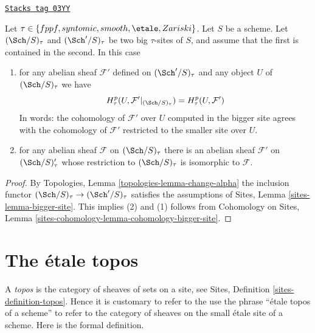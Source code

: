 \begin{lemma}
\label{etale-cohomology-lemma-cohomology-enlarge-partial-universe}
\href{https://stacks.math.columbia.edu/tag/03YY}{\texttt{Stacks tag 03YY}}

Let $\tau \in \{fppf, syntomic, smooth, \etale, Zariski\}$.
Let $S$ be a scheme.
Let $(\Sch/S)_\tau$ and $(\Sch'/S)_\tau$ be two
big $\tau$-sites of $S$, and assume that the first is contained in the second.
In this case
\begin{enumerate}
\item for any abelian sheaf $\mathcal{F}'$ defined on $(\Sch'/S)_\tau$ and
any object $U$ of $(\Sch/S)_\tau$ we have
$$
H^p_\tau(U, \mathcal{F}'|_{(\Sch/S)_\tau}) =
H^p_\tau(U, \mathcal{F}')
$$
In words: the cohomology of $\mathcal{F}'$ over $U$ computed in the bigger site
agrees with the cohomology of $\mathcal{F}'$ restricted to the smaller site
over $U$.
\item for any abelian sheaf $\mathcal{F}$ on $(\Sch/S)_\tau$ there is an
abelian sheaf $\mathcal{F}'$ on $(\Sch/S)_\tau'$ whose restriction to
$(\Sch/S)_\tau$ is isomorphic to $\mathcal{F}$.
\end{enumerate}
\end{lemma}

\begin{proof}
By Topologies, Lemma \ref{topologies-lemma-change-alpha} the inclusion functor
$(\Sch/S)_\tau \to (\Sch'/S)_\tau$ satisfies the assumptions of
Sites, Lemma \ref{sites-lemma-bigger-site}. This implies (2) and (1)
follows from
Cohomology on Sites, Lemma \ref{sites-cohomology-lemma-cohomology-bigger-site}.
\end{proof}

\section{The \'etale topos}
\label{etale-cohomology-section-etale-topos}
A {\it topos} is the category of sheaves of sets on a site, see
Sites, Definition \ref{sites-definition-topos}. Hence it is customary
to refer to the use the phrase ``\'etale topos of a scheme'' to refer to
the category of sheaves on the small \'etale site of a scheme.
Here is the formal definition.

